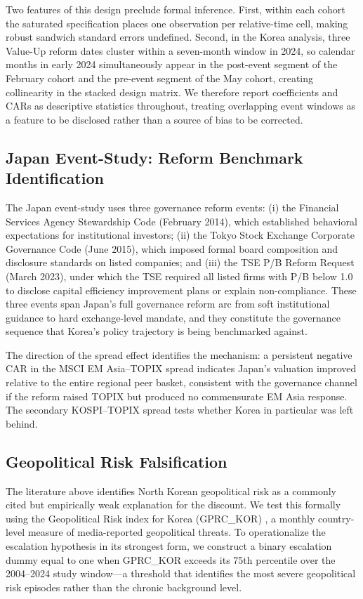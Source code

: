 Two features of this design preclude formal inference. First, within each cohort the saturated specification places one observation per relative-time cell, making robust sandwich standard errors undefined. Second, in the Korea analysis, three Value-Up reform dates cluster within a seven-month window in 2024, so calendar months in early 2024 simultaneously appear in the post-event segment of the February cohort and the pre-event segment of the May cohort, creating collinearity in the stacked design matrix. We therefore report coefficients and CARs as descriptive statistics throughout, treating overlapping event windows as a feature to be disclosed rather than a source of bias to be corrected.

\subsection{Japan Event-Study: Reform Benchmark Identification}

The Japan event-study uses three governance reform events: (i) the Financial Services Agency Stewardship Code (February 2014), which established behavioral expectations for institutional investors; (ii) the Tokyo Stock Exchange Corporate Governance Code (June 2015), which imposed formal board composition and disclosure standards on listed companies; and (iii) the TSE P/B Reform Request (March 2023), under which the TSE required all listed firms with P/B below 1.0 to disclose capital efficiency improvement plans or explain non-compliance. These three events span Japan's full governance reform arc from soft institutional guidance to hard exchange-level mandate, and they constitute the governance sequence that Korea's policy trajectory is being benchmarked against.

The direction of the spread effect identifies the mechanism: a persistent negative CAR in the MSCI EM Asia--TOPIX spread indicates Japan's valuation improved relative to the entire regional peer basket, consistent with the governance channel if the reform raised TOPIX but produced no commensurate EM Asia response. The secondary KOSPI--TOPIX spread tests whether Korea in particular was left behind.

\subsection{Geopolitical Risk Falsification}

The literature above identifies North Korean geopolitical risk as a commonly cited but empirically weak explanation for the discount. We test this formally using the Geopolitical Risk index for Korea (GPRC\_KOR) \citep{caldara_gprc_2022}, a monthly country-level measure of media-reported geopolitical threats. To operationalize the escalation hypothesis in its strongest form, we construct a binary escalation dummy equal to one when GPRC\_KOR exceeds its 75th percentile over the 2004--2024 study window---a threshold that identifies the most severe geopolitical risk episodes rather than the chronic background level.

